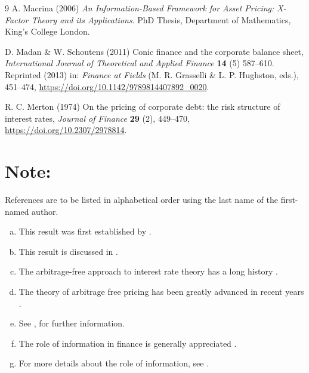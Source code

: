 \documentclass{ws-ijtaf}
\begin{document}
\begin{thebibliography}{9}
 A. Macrina (2006) {\it An Information-Based Framework for Asset Pricing: X-Factor Theory and its Applications}. PhD Thesis, Department of Mathematics, King's College London.

 D. Madan \& W. Schoutens (2011) Conic finance and the corporate balance sheet, {\it International Journal of Theoretical and Applied Finance} {\bf 14} (5) 587--610. Reprinted (2013) in: {\it Finance at Fields} (M. R. Grasselli \& L. P. Hughston, eds.), 451--474, \url{https://doi.org/10.1142/9789814407892_0020}.

 R. C. Merton (1974) On the pricing of corporate debt: the risk structure of interest rates,
{\it Journal of Finance} {\bf 29} (2), 449--470, \url{https://doi.org/10.2307/2978814}.
\end{thebibliography}

\section*{Note:}
References are to be listed in alphabetical order using the last name of the first-named author.


\begin{enumerate}[(f)]
\item[(a)] This result was first established by \cite{mer74}.
\item[(b)] This result is discussed in \cite{mer74}.
\item[(c)] The arbitrage-free approach to interest rate theory has a long history \citep{mer74}.
\item[(d)] The theory of arbitrage free pricing has been greatly advanced in recent years \citep{del94,kar98,duf01}.
\item[(e)] See \cite{del94,kar98,duf01}, for further information.
\item[(f)] The role of information in finance is generally appreciated \citep{bro07,bro08a,bro08b}.
\item[(g)] For more details about the role of information, see \cite{bro07,bro08a,bro08b}.
\end{enumerate}
\end{document}
